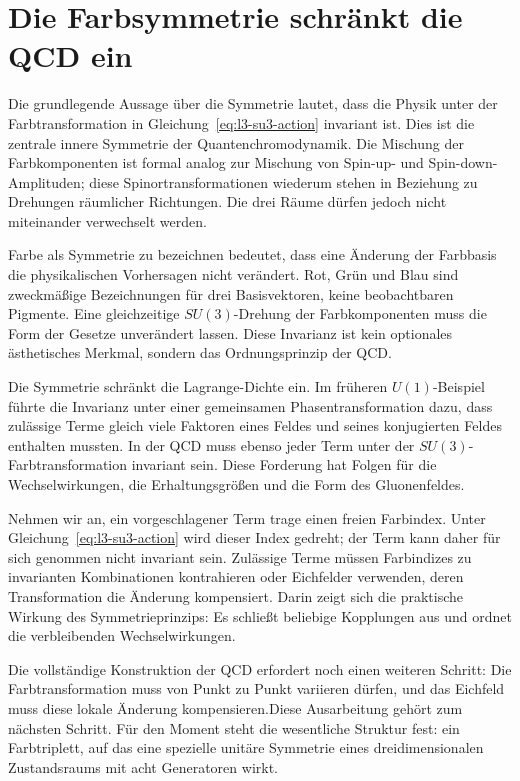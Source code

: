 \section{Die Farbsymmetrie schränkt die QCD ein}

Die grundlegende Aussage über die Symmetrie lautet, dass die Physik unter der Farbtransformation in Gleichung~\eqref{eq:l3-su3-action} invariant ist. Dies ist die zentrale innere Symmetrie der Quantenchromodynamik. Die Mischung der Farbkomponenten ist formal analog zur Mischung von Spin-up- und Spin-down-Amplituden; diese Spinortransformationen wiederum stehen in Beziehung zu Drehungen räumlicher Richtungen. Die drei Räume dürfen jedoch nicht miteinander verwechselt werden.

Farbe als Symmetrie zu bezeichnen bedeutet, dass eine Änderung der Farbbasis die physikalischen Vorhersagen nicht verändert. Rot, Grün und Blau sind zweckmäßige Bezeichnungen für drei Basisvektoren, keine beobachtbaren Pigmente. Eine gleichzeitige \(SU(3)\)-Drehung der Farbkomponenten muss die Form der Gesetze unverändert lassen. Diese Invarianz ist kein optionales ästhetisches Merkmal, sondern das Ordnungsprinzip der QCD.

Die Symmetrie schränkt die Lagrange-Dichte ein. Im früheren \(U(1)\)-Beispiel führte die Invarianz unter einer gemeinsamen Phasentransformation dazu, dass zulässige Terme gleich viele Faktoren eines Feldes und seines konjugierten Feldes enthalten mussten. In der QCD muss ebenso jeder Term unter der \(SU(3)\)-Farbtransformation invariant sein. Diese Forderung hat Folgen für die Wechselwirkungen, die Erhaltungsgrößen und die Form des Gluonenfeldes.

Nehmen wir an, ein vorgeschlagener Term trage einen freien Farbindex. Unter Gleichung~\eqref{eq:l3-su3-action} wird dieser Index gedreht; der Term kann daher für sich genommen nicht invariant sein. Zulässige Terme müssen Farbindizes zu invarianten Kombinationen kontrahieren oder Eichfelder verwenden, deren Transformation die Änderung kompensiert. Darin zeigt sich die praktische Wirkung des Symmetrieprinzips: Es schließt beliebige Kopplungen aus und ordnet die verbleibenden Wechselwirkungen.

Die vollständige Konstruktion der QCD erfordert noch einen weiteren Schritt: Die Farbtransformation muss von Punkt zu Punkt variieren dürfen, und das Eichfeld muss diese lokale Änderung kompensieren.Diese Ausarbeitung gehört zum nächsten Schritt. Für den Moment steht die wesentliche Struktur fest: ein Farbtriplett, auf das eine spezielle unitäre Symmetrie eines dreidimensionalen Zustandsraums mit acht Generatoren wirkt.

